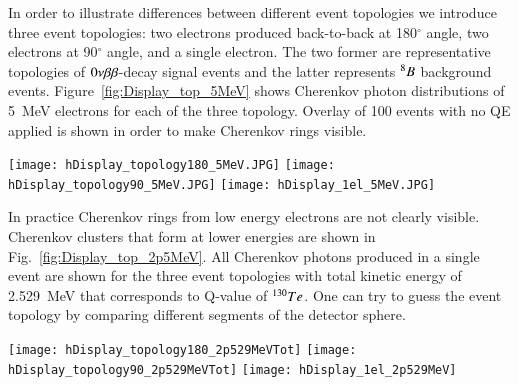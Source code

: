 In order to illustrate differences between different event topologies we introduce three event topologies: two electrons produced back-to-back at 180$^{\circ}$ angle, two electrons at 90$^{\circ}$ angle, and a single electron. The two former are representative topologies of $0\nu\beta\beta$-decay signal events and the latter represents $^{8}B$ background events. Figure~\ref{fig:Display_top_5MeV} shows Cherenkov photon distributions of 5~MeV electrons for each of the three topology. Overlay of 100 events with no QE applied is shown in order to make Cherenkov rings visible.


\begin{figure*}[h]
  \centering
  \texttt{[image: hDisplay\_topology180\_5MeV.JPG]}
  \texttt{[image: hDisplay\_topology90\_5MeV.JPG]}
  \texttt{[image: hDisplay\_1el\_5MeV.JPG]}
  \caption{Cherenkov photons distributions on the detector sphere for
    the three representative event topologies: two back-to-back
    electrons (\emph{left}), two electrons at 90$^{\circ}$ angle
    (\emph{middle}), and a single electron (\emph{center}).  All
    electrons are 5~MeV and originate at the center of the
    detector. 100 events overlayed for better visibility of the
    Cherenkov rings. 100\% QE is assumed. }
  \label{fig:Display_top_5MeV}
\end{figure*}

In practice Cherenkov rings from low energy electrons are not clearly
visible. Cherenkov clusters that form at lower energies are shown in Fig.~\ref{fig:Display_top_2p5MeV}. All Cherenkov photons produced in a single event are shown for the three event topologies with total kinetic energy of 2.529~MeV that corresponds to Q-value of $^{130}Te$. One can try to guess the event topology by comparing different segments of the detector sphere.

\begin{figure*}[h]
  \centering
  \texttt{[image: hDisplay\_topology180\_2p529MeVTot]}
  \texttt{[image: hDisplay\_topology90\_2p529MeVTot]}
  \texttt{[image: hDisplay\_1el\_2p529MeV]}
  \caption{Cherenkov photons distributions on the detector sphere for
    the three representative event topologies: two back-to-back 1.26~MeV
    electrons (\emph{left}), two 1.26~MeV electrons at 90$^{\circ}$
    angle (\emph{middle}), and a single 2.529~MeV electron
    (\emph{center}).  All electrons originate at the center of the
    detector. One randomly selected event is chosen for each
    category. Default QE is applied.}
  \label{fig:Display_top_2p5MeV}
\end{figure*}

